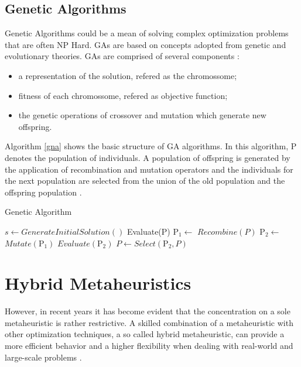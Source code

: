\subsection{Genetic Algorithms}

Genetic Algorithms could be a mean of solving complex optimization problems that are often NP Hard. GAs are based on concepts adopted from genetic and evolutionary theories. GAs are comprised of several components \cite{hong2000simultaneously} \cite{shousha2003performance} :

\begin{itemize}
\item a representation of the solution, refered as the chromossome;
\item fitness of each chromossome, refered as objective function;
\item the genetic operations of crossover and mutation which generate new offspring. 
\end{itemize}


Algorithm \ref{gna} shows the basic structure of GA algorithms. In this algorithm, P denotes the population of individuals. A population of offspring is generated by the application of recombination and mutation operators and the individuals for the next population are selected from the union of the old population and the offspring population \cite{raidl2010metaheuristic}.


\begin{algorithm}[h]
  \caption{Genetic Algorithm}\label{gna}
  \begin{algorithmic}[3]
    
    \State $s\gets GenerateInitialSolution()$
    \State Evaluate(P)
    \State $\mbox{P}_1\gets$ $Recombine(P)$
    \State $\mbox{P}_2\gets$ $Mutate(\mbox{P}_1)$ 
    \State $Evaluate(\mbox{P}_2)$
    \State $P\gets Select(\mbox{P}_2,P)$
    \EndWhile
      
  \end{algorithmic}
\end{algorithm}

\section{Hybrid  Metaheuristics}

However, in recent years it has become evident that the concentration on a sole metaheuristic is rather restrictive. A skilled combination of a metaheuristic with other optimization techniques, a so called hybrid metaheuristic, can provide a more efficient behavior
and a higher flexibility when dealing with real-world and large-scale problems \cite{Talbi2012}.

